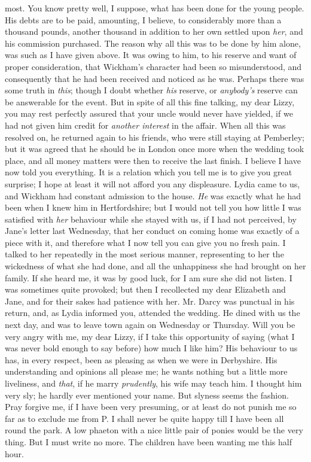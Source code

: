 \documentclass[12pt]{book}
\begin{document}
most. You know pretty well, I suppose, what has been done for the young people. His debts are to be paid, amounting, I believe, to considerably more than a thousand pounds, another thousand in addition to her own settled upon \textit{her}, and his commission purchased. The reason why all this was to be done by him alone, was such as I have given above. It was owing to him, to his reserve and want of proper consideration, that Wickham's character had been so misunderstood, and consequently that he had been received and noticed as he was. Perhaps there was some truth in \textit{this}; though I doubt whether \textit{his} reserve, or \textit{anybody's} reserve can be answerable for the event. But in spite of all this fine talking, my dear Lizzy, you may rest perfectly assured that your uncle would never have yielded, if we had not given him credit for \textit{another interest} in the affair. When all this was resolved on, he returned again to his friends, who were still staying at Pemberley; but it was agreed that he should be in London once more when the wedding took place, and all money matters were then to receive the last finish. I believe I have now told you everything. It is a relation which you tell me is to give you great surprise; I hope at least it will not afford you any displeasure. Lydia came to us, and Wickham had constant admission to the house. \textit{He} was exactly what he had been when I knew him in Hertfordshire; but I would not tell you how little I was satisfied with \textit{her} behaviour while she stayed with us, if I had not perceived, by Jane's letter last Wednesday, that her conduct on coming home was exactly of a piece with it, and therefore what I now tell you can give you no fresh pain. I talked to her repeatedly in the most serious manner, representing to her the wickedness of what she had done, and all the unhappiness she had brought on her family. If she heard me, it was by good luck, for I am sure she did not listen. I was sometimes quite provoked; but then I recollected my dear Elizabeth and Jane, and for their sakes had patience with her. Mr. Darcy was punctual in his return, and, as Lydia informed you, attended the wedding. He dined with us the next day, and was to leave town again on Wednesday or Thursday. Will you be very angry with me, my dear Lizzy, if I take this opportunity of saying (what I was never bold enough to say before) how much I like him? His behaviour to us has, in every respect, been as pleasing as when we were in Derbyshire. His understanding and opinions all please me; he wants nothing but a little more liveliness, and \textit{that}, if he marry \textit{prudently}, his wife may teach him. I thought him very sly; he hardly ever mentioned your name. But slyness seems the fashion. Pray forgive me, if I have been very presuming, or at least do not punish me so far as to exclude me from P. I shall never be quite happy till I have been all round the park. A low phaeton with a nice little pair of ponies would be the very thing. But I must write no more. The children have been wanting me this half hour.
\end{document}
